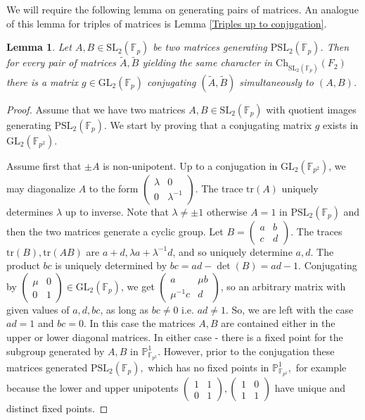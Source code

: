 \documentclass[letterpaper]{amsart}
\newtheorem{lemma}[theorem]{Lemma}
\begin{document}
We will require the following lemma on generating pairs of matrices. An analogue of this lemma for triples of matrices is Lemma \ref{Triples up to conjugation}.
\begin{lemma}
\label{Pairs up to conjugation}
Let $A,B \in \mathrm{SL}_2(\mathbb{F}_p)$ be two matrices generating $\mathrm{PSL}_2(\mathbb{F}_p)$. Then for every pair of matrices $\tilde{A},\tilde{B}$ yielding the same character in $\mathrm{Ch}_{\mathrm{SL}_2(\mathbb{F}_p)}(F_2)$ there is a matrix $g \in \mathrm{GL}_2(\mathbb{F}_p)$ conjugating $(\tilde{A},\tilde{B})$ simultaneously to $(A,B)$.
\end{lemma}
\begin{proof}
    Assume that we have two matrices $A,B\in\mathrm{SL}_2(\mathbb{F}_p)$ with quotient images generating $\mathrm{PSL}_2(\mathbb{F}_p)$. We start by proving that a conjugating matrix $g$ exists in $\mathrm{GL}_2(\mathbb{F}_{p^2}).$

    Assume first that $\pm A$ is non-unipotent. Up to a conjugation in $\mathrm{GL}_2(\mathbb{F}_{p^2})$, we may diagonalize $A$ to the form $\begin{pmatrix}\lambda & 0 \\ 0 & \lambda^{-1}\end{pmatrix}.$ The trace $\mathrm{tr}(A)$ uniquely determines $\lambda$ up to inverse. Note that $\lambda \neq \pm 1$ otherwise $A = 1$ in $\mathrm{PSL}_2(\mathbb{F}_p)$ and then the two matrices generate a cyclic group. Let $B = \begin{pmatrix}a & b \\ c & d\end{pmatrix}.$ The traces $\mathrm{tr}(B),\mathrm{tr}(AB)$ are $a+d, \lambda a + \lambda^{-1}d$, and so uniquely determine $a,d$. The product $bc$ is uniquely determined by $bc = ad -  \det(B) = ad - 1$. Conjugating by $\begin{pmatrix}\mu & 0 \\ 0 & 1\end{pmatrix} \in \mathrm{GL}_2(\mathbb{F}_p)$, we get $\begin{pmatrix}a & \mu b \\ \mu^{-1}c & d\end{pmatrix}$, so an arbitrary matrix with given values of $a,d,bc$, as long as $bc \neq 0$ i.e. $ad \neq 1.$ So, we are left with the case $ad = 1$ and $bc = 0$. In this case the matrices $A,B$ are contained either in the upper or lower diagonal matrices. In either case - there is a fixed point for the subgroup generated by $A, B$ in $\mathbb{P}^1_{\mathbb{F}_{p^2}}.$ However, prior to the conjugation these matrices generated $\mathrm{PSL}_2(\mathbb{F}_p),$ which has no fixed points in $\mathbb{P}^1_{\mathbb{F}_{p^2}},$ for example because the lower and upper unipotents $\begin{pmatrix} 1 & 1 \\ 0 &  1 \end{pmatrix}, \begin{pmatrix} 1 & 0 \\ 1 & 1 \end{pmatrix}$ have unique and distinct fixed points.


\end{proof}
\end{document}
